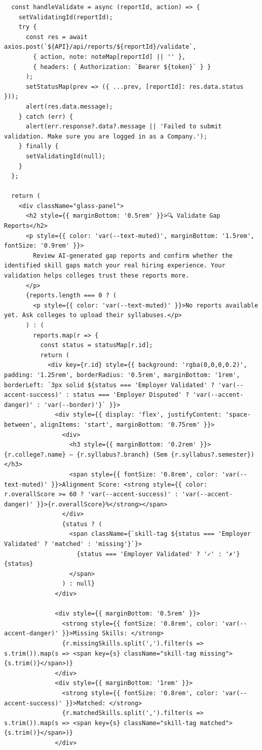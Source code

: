 \documentclass[12pt,a4paper]{report}
\begin{document}
\begin{verbatim}
  const handleValidate = async (reportId, action) => {
    setValidatingId(reportId);
    try {
      const res = await axios.post(`${API}/api/reports/${reportId}/validate`,
        { action, note: noteMap[reportId] || '' },
        { headers: { Authorization: `Bearer ${token}` } }
      );
      setStatusMap(prev => ({ ...prev, [reportId]: res.data.status }));
      alert(res.data.message);
    } catch (err) {
      alert(err.response?.data?.message || 'Failed to submit validation. Make sure you are logged in as a Company.');
    } finally {
      setValidatingId(null);
    }
  };

  return (
    <div className="glass-panel">
      <h2 style={{ marginBottom: '0.5rem' }}>🔍 Validate Gap Reports</h2>
      <p style={{ color: 'var(--text-muted)', marginBottom: '1.5rem', fontSize: '0.9rem' }}>
        Review AI-generated gap reports and confirm whether the identified skill gaps match your real hiring experience. Your validation helps colleges trust these reports more.
      </p>
      {reports.length === 0 ? (
        <p style={{ color: 'var(--text-muted)' }}>No reports available yet. Ask colleges to upload their syllabuses.</p>
      ) : (
        reports.map(r => {
          const status = statusMap[r.id];
          return (
            <div key={r.id} style={{ background: 'rgba(0,0,0,0.2)', padding: '1.25rem', borderRadius: '0.5rem', marginBottom: '1rem', borderLeft: `3px solid ${status === 'Employer Validated' ? 'var(--accent-success)' : status === 'Employer Disputed' ? 'var(--accent-danger)' : 'var(--border)'}` }}>
              <div style={{ display: 'flex', justifyContent: 'space-between', alignItems: 'start', marginBottom: '0.75rem' }}>
                <div>
                  <h3 style={{ marginBottom: '0.2rem' }}>{r.college?.name} — {r.syllabus?.branch} (Sem {r.syllabus?.semester})</h3>
                  <span style={{ fontSize: '0.8rem', color: 'var(--text-muted)' }}>Alignment Score: <strong style={{ color: r.overallScore >= 60 ? 'var(--accent-success)' : 'var(--accent-danger)' }}>{r.overallScore}%</strong></span>
                </div>
                {status ? (
                  <span className={`skill-tag ${status === 'Employer Validated' ? 'matched' : 'missing'}`}>
                    {status === 'Employer Validated' ? '✓' : '✗'} {status}
                  </span>
                ) : null}
              </div>

              <div style={{ marginBottom: '0.5rem' }}>
                <strong style={{ fontSize: '0.8rem', color: 'var(--accent-danger)' }}>Missing Skills: </strong>
                {r.missingSkills.split(',').filter(s => s.trim()).map(s => <span key={s} className="skill-tag missing">{s.trim()}</span>)}
              </div>
              <div style={{ marginBottom: '1rem' }}>
                <strong style={{ fontSize: '0.8rem', color: 'var(--accent-success)' }}>Matched: </strong>
                {r.matchedSkills.split(',').filter(s => s.trim()).map(s => <span key={s} className="skill-tag matched">{s.trim()}</span>)}
              </div>


\end{verbatim}
\end{document}

